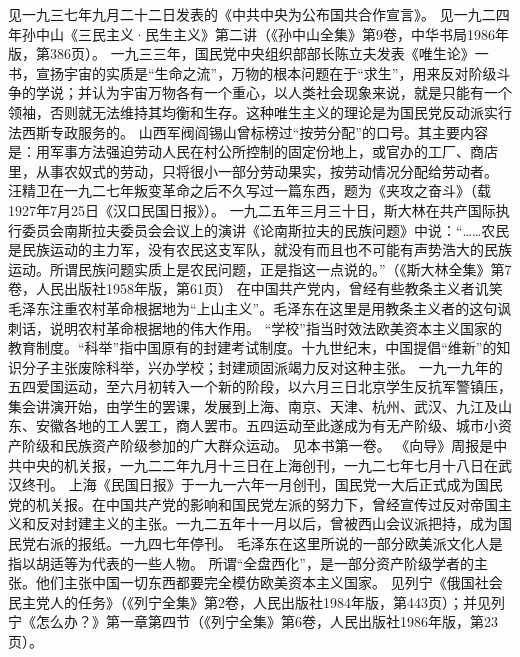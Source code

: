 \begin{maonote}
见一九三七年九月二十二日发表的《中共中央为公布国共合作宣言》。
见一九二四年孙中山《三民主义·民生主义》第二讲（《孙中山全集》第9卷，中华书局1986年版，第386页）。
一九三三年，国民党中央组织部部长陈立夫发表《唯生论》一书，宣扬宇宙的实质是“生命之流”，万物的根本问题在于“求生”，用来反对阶级斗争的学说；并认为宇宙万物各有一个重心，以人类社会现象来说，就是只能有一个领袖，否则就无法维持其均衡和生存。这种唯生主义的理论是为国民党反动派实行法西斯专政服务的。
山西军阀阎锡山曾标榜过“按劳分配”的口号。其主要内容是：用军事方法强迫劳动人民在村公所控制的固定份地上，或官办的工厂、商店里，从事农奴式的劳动，只将很小一部分劳动果实，按劳动情况分配给劳动者。
汪精卫在一九二七年叛变革命之后不久写过一篇东西，题为《夹攻之奋斗》（载1927年7月25日《汉口民国日报》）。
一九二五年三月三十日，斯大林在共产国际执行委员会南斯拉夫委员会会议上的演讲《论南斯拉夫的民族问题》中说：“……农民是民族运动的主力军，没有农民这支军队，就没有而且也不可能有声势浩大的民族运动。所谓民族问题实质上是农民问题，正是指这一点说的。”（《斯大林全集》第7卷，人民出版社1958年版，第61页）
在中国共产党内，曾经有些教条主义者讥笑毛泽东注重农村革命根据地为“上山主义”。毛泽东在这里是用教条主义者的这句讽刺话，说明农村革命根据地的伟大作用。
“学校”指当时效法欧美资本主义国家的教育制度。“科举”指中国原有的封建考试制度。十九世纪末，中国提倡“维新”的知识分子主张废除科举，兴办学校；封建顽固派竭力反对这种主张。
一九一九年的五四爱国运动，至六月初转入一个新的阶段，以六月三日北京学生反抗军警镇压，集会讲演开始，由学生的罢课，发展到上海、南京、天津、杭州、武汉、九江及山东、安徽各地的工人罢工，商人罢市。五四运动至此遂成为有无产阶级、城市小资产阶级和民族资产阶级参加的广大群众运动。
见本书第一卷。
《向导》周报是中共中央的机关报，一九二二年九月十三日在上海创刊，一九二七年七月十八日在武汉终刊。
上海《民国日报》于一九一六年一月创刊，国民党一大后正式成为国民党的机关报。在中国共产党的影响和国民党左派的努力下，曾经宣传过反对帝国主义和反对封建主义的主张。一九二五年十一月以后，曾被西山会议派把持，成为国民党右派的报纸。一九四七年停刊。
毛泽东在这里所说的一部分欧美派文化人是指以胡适等为代表的一些人物。
所谓“全盘西化”，是一部分资产阶级学者的主张。他们主张中国一切东西都要完全模仿欧美资本主义国家。
见列宁《俄国社会民主党人的任务》（《列宁全集》第2卷，人民出版社1984年版，第443页）；并见列宁《怎么办？》第一章第四节（《列宁全集》第6卷，人民出版社1986年版，第23页）。
\end{maonote}
